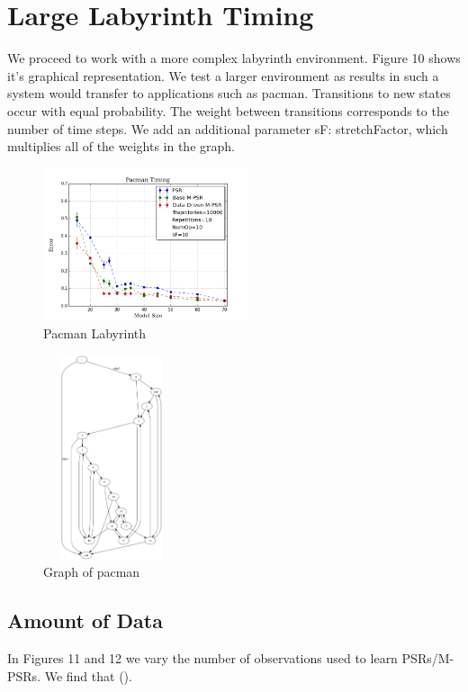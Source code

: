 \section{Large Labyrinth Timing}

We proceed to work with a more complex labyrinth environment. Figure 10 shows it's graphical representation. We test a larger environment as results in such a system would transfer to applications such as pacman. Transitions to new states occur with equal probability. The weight between transitions corresponds to the number of time steps. We add an additional parameter sF: stretchFactor, which multiplies all of the weights in the graph. 

\begin{figure}[ht!]
\centering
\includegraphics[width=60mm]{uCOREPICS/Pacman/Pacman10k.png}
\caption{Pacman Labyrinth\label{overflow}}
\end{figure}

\begin{figure}[ht!]
\centering
\includegraphics[width=40mm,height=60mm]{uCOREPICS/Pacman/graphPacMan.png}
\caption{Graph of pacman\label{overflow}}
\end{figure}

\subsection{Amount of Data}

In Figures 11 and 12 we vary the number of observations used to learn PSRs/M-PSRs. We find that ().

